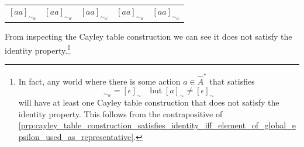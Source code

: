 \begin{proofE}
\begin{enumerate}
\begin{table}[H]
\begin{tabular}{c|cccc}
            $[aa]_{\sim_{w}}$   & $[aa]_{\sim_{w}}$ & $[aa]_{\sim_{w}}$  & $[aa]_{\sim_{w}}$  & $[aa]_{\sim_{w}}$
        \end{tabular}
        \caption{
        }
    \end{table}
    From inspecting the Cayley table construction we can see it does not satisfy the identity property.\footnote{
    In fact, any world where there is some action $a \in \hat{A}^{*}$ that satisfies
    \begin{equation}
        [a]_{\sim_{w}} = [\epsilon]_{\sim} \quad \text{but} \; [a]_{\sim} \neq [\epsilon]_{\sim}
    \end{equation}
    will have at least one Cayley table construction that does not satisfy the identity property.
    This follows from the contrapositive of \cref{prp:cayley_table_construction_satisfies_identity_iff_element_of_global_epsilon_used_as_representative}.
    }
\end{enumerate}
\end{proofE}


